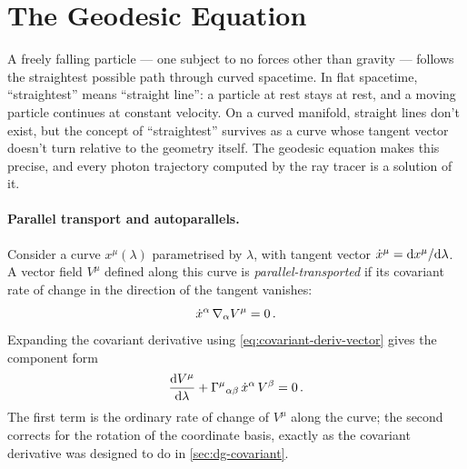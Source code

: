 \section{The Geodesic Equation}
\label{sec:dg-geodesic}

A freely falling particle --- one subject to no forces other than gravity ---
follows the straightest possible path through curved spacetime.  In flat
spacetime, ``straightest'' means ``straight line'': a particle at rest stays at
rest, and a moving particle continues at constant velocity.  On a curved
manifold, straight lines don't exist, but the concept of ``straightest''
survives as a curve whose tangent vector doesn't turn relative to the geometry
itself.  The geodesic equation makes this precise, and every photon trajectory
computed by the ray tracer is a solution of it.

\paragraph{Parallel transport and autoparallels.}

Consider a curve $x^\mu(\lambda)$ parametrised by $\lambda$, with tangent
vector $\dot{x}^\mu = \mathrm{d} x^\mu / \mathrm{d}\lambda$.  A vector field $V^\mu$ defined
along this curve is \emph{parallel-transported} if its covariant rate of change
in the direction of the tangent vanishes:
%
\begin{equation}
  \dot{x}^\alpha\,\nabla_{\alpha} V^\mu = 0 \,.
  \label{eq:parallel-transport}
\end{equation}
%
Expanding the covariant derivative using \cref{eq:covariant-deriv-vector}
gives the component form
%
\begin{equation}
  \frac{\mathrm{d} V^\mu}{\mathrm{d}\lambda}
  + \Gamma^{\mu}{}_{\alpha \beta}\,\dot{x}^\alpha\, V^\beta = 0 \,.
  \label{eq:parallel-transport-components}
\end{equation}
%
The first term is the ordinary rate of change of $V^\mu$ along the curve; the
second corrects for the rotation of the coordinate basis, exactly as the
covariant derivative was designed to do in \cref{sec:dg-covariant}.


